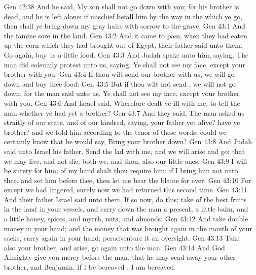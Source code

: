 \vs Gen 42:38 And he said, My son shall not go down with you; for his brother is dead, and he is left alone: if mischief befall him by the way in the which ye go, then shall ye bring down my gray hairs with sorrow to the grave.
\vs Gen 43:1 And the famine  sore in the land.
\vs Gen 43:2 And it came to pass, when they had eaten up the corn which they had brought out of Egypt, their father said unto them, Go again, buy us a little food.
\vs Gen 43:3 And Judah spake unto him, saying, The man did solemnly protest unto us, saying, Ye shall not see my face, except your brother  with you.
\vs Gen 43:4 If thou wilt send our brother with us, we will go down and buy thee food:
\vs Gen 43:5 But if thou wilt not send , we will not go down: for the man said unto us, Ye shall not see my face, except your brother  with you.
\vs Gen 43:6 And Israel said, Wherefore dealt ye  ill with me,  to tell the man whether ye had yet a brother?
\vs Gen 43:7 And they said, The man asked us straitly of our state, and of our kindred, saying,  your father yet alive? have ye  brother? and we told him according to the tenor of these words: could we certainly know that he would say, Bring your brother down?
\vs Gen 43:8 And Judah said unto Israel his father, Send the lad with me, and we will arise and go; that we may live, and not die, both we, and thou,  also our little ones.
\vs Gen 43:9 I will be surety for him; of my hand shalt thou require him: if I bring him not unto thee, and set him before thee, then let me bear the blame for ever:
\vs Gen 43:10 For except we had lingered, surely now we had returned this second time.
\vs Gen 43:11 And their father Israel said unto them, If  so now, do this; take of the best fruits in the land in your vessels, and carry down the man a present, a little balm, and a little honey, spices, and myrrh, nuts, and almonds:
\vs Gen 43:12 And take double money in your hand; and the money that was brought again in the mouth of your sacks, carry  again in your hand; peradventure it  an oversight:
\vs Gen 43:13 Take also your brother, and arise, go again unto the man:
\vs Gen 43:14 And God Almighty give you mercy before the man, that he may send away your other brother, and Benjamin. If I be bereaved , I am bereaved.
